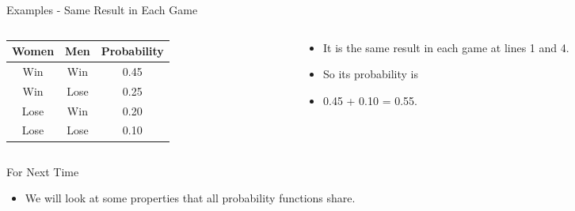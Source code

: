 \documentclass[
  ignorenonframetext,
]{beamer}
\providecommand{\tightlist}{%
  \setlength{\itemsep}{0pt}\setlength{\parskip}{0pt}}
\renewcommand{\,}{\text{, }}
\begin{document}
\begin{frame}{Examples - Same Result in Each Game}
\protect\hypertarget{examples---same-result-in-each-game}{}
\begin{columns}[T]
\begin{column}{0.48\textwidth}
\begin{longtable}[]{@{}ccc@{}}
\toprule
Women & Men & Probability \\
\midrule
\endhead
Win & Win & 0.45 \\
Win & Lose & 0.25 \\
Lose & Win & 0.20 \\
Lose & Lose & 0.10 \\
\bottomrule
\end{longtable}
\end{column}

\begin{column}{0.48\textwidth}
\bigskip

\begin{itemize}
\tightlist
\item
  It is the same result in each game at lines 1 and 4.
\item
  So its probability is
\item
  0.45 + 0.10 = 0.55.
\end{itemize}
\end{column}
\end{columns}
\end{frame}

\begin{frame}{For Next Time}
\protect\hypertarget{for-next-time}{}
\begin{itemize}
\tightlist
\item
  We will look at some properties that all probability functions share.
\end{itemize}
\end{frame}
\end{document}
